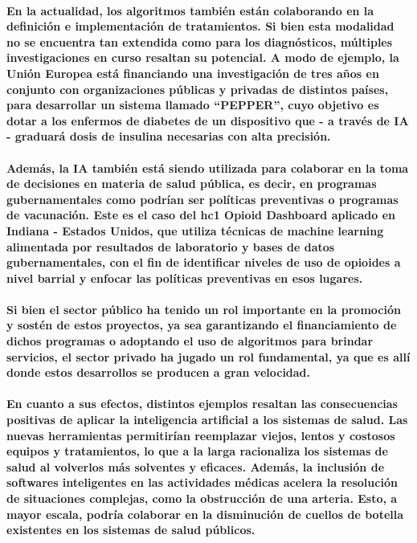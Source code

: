 \documentclass[a4paper,11pt,twocolumn]{article}
\begin{document}
\paragraph{En la actualidad, los algoritmos también están colaborando en la definición e implementación de tratamientos. Si bien esta modalidad no se encuentra tan extendida como para los diagnósticos, múltiples investigaciones en curso resaltan su potencial. A modo de ejemplo, la Unión Europea está financiando una investigación de tres años en conjunto con organizaciones públicas y privadas de distintos países, para desarrollar un sistema llamado “PEPPER”, cuyo objetivo es dotar a los enfermos de diabetes de un dispositivo que - a través de IA - graduará dosis de insulina necesarias con alta precisión.}
\paragraph{Además, la IA también está siendo utilizada para colaborar en la toma de decisiones en materia de salud pública, es decir, en programas gubernamentales como podrían ser políticas preventivas o programas de vacunación. Este es el caso del hc1 Opioid Dashboard aplicado en Indiana - Estados Unidos, que utiliza técnicas de machine learning alimentada por resultados de laboratorio y bases de datos gubernamentales, con el fin de identificar niveles de uso de opioides a nivel barrial y enfocar las políticas preventivas en esos lugares.}
\paragraph{Si bien el sector público ha tenido un rol importante en la promoción y sostén de estos proyectos, ya sea garantizando el financiamiento de dichos programas o adoptando el uso de algoritmos para brindar servicios, el sector privado ha jugado un rol fundamental, ya que es allí donde estos desarrollos se producen a gran velocidad.}
\paragraph{En cuanto a sus efectos, distintos ejemplos resaltan las consecuencias positivas de aplicar la inteligencia artificial a los sistemas de salud. Las nuevas herramientas permitirían reemplazar viejos, lentos y costosos equipos y tratamientos, lo que a la larga racionaliza los sistemas de salud al volverlos más solventes y eficaces. Además, la inclusión de softwares inteligentes en las actividades médicas acelera la resolución de situaciones complejas, como la obstrucción de una arteria. Esto, a mayor escala, podría colaborar en la disminución de cuellos de botella existentes en los sistemas de salud públicos.}
\end{document}
